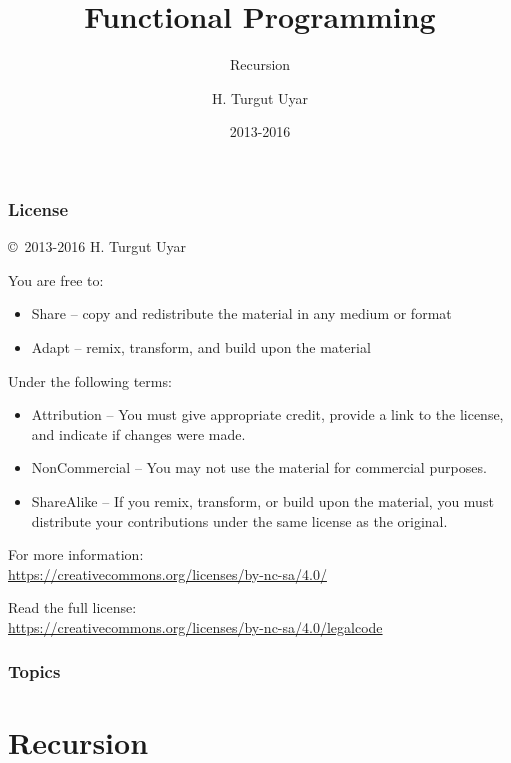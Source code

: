 \documentclass[dvipsnames]{beamer}
\title{Functional Programming}
\subtitle{Recursion}
\author{H. Turgut Uyar}
\date{2013-2016}
\theoremstyle{plain}
\begin{document}
\begin{frame}
  \titlepage
\end{frame}

\begin{frame}
  \frametitle{License}

  \hfill
  \copyright~2013-2016 H. Turgut Uyar

  \vfill
  \begin{footnotesize}
    You are free to:
    \begin{itemize}
      \itemsep0em
      \item Share -- copy and redistribute the material in any medium or format
      \item Adapt -- remix, transform, and build upon the material
    \end{itemize}

    Under the following terms:
    \begin{itemize}
      \itemsep0em
      \item Attribution -- You must give appropriate credit, provide a link to
        the license, and indicate if changes were made.

      \item NonCommercial -- You may not use the material for commercial
        purposes.

      \item ShareAlike -- If you remix, transform, or build upon the material,
        you must distribute your contributions under the same license as the
        original.
    \end{itemize}

    For more information:\\
    \url{https://creativecommons.org/licenses/by-nc-sa/4.0/}

    \smallskip
    Read the full license:\\
    \url{https://creativecommons.org/licenses/by-nc-sa/4.0/legalcode}
  \end{footnotesize}
\end{frame}

\begin{frame}
  \frametitle{Topics}
  \tableofcontents
\end{frame}

\section{Recursion}

\end{document}
